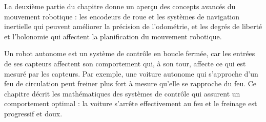 {\begin{description}
La deuxième partie du chapitre donne un aperçu des concepts avancés du mouvement robotique : les encodeurs de roue et les systèmes de navigation inertielle qui peuvent améliorer la précision de l'odométrie, et les degrés de liberté et l'holonomie qui affectent la planification du mouvement robotique.
\smallskip
\item [\textbf{Chapitre \ref{ch.control} Contrôle}] Un robot autonome est un système de contrôle en boucle fermée, car les entrées de ses capteurs affectent son comportement qui, à son tour, affecte ce qui est mesuré par les capteurs. Par exemple, une voiture autonome qui s'approche d'un feu de circulation peut freiner plus fort à mesure qu'elle se rapproche du feu. Ce chapitre décrit les mathématiques des systèmes de contrôle qui assurent un comportement optimal : la voiture s'arrête effectivement au feu et le freinage est progressif et doux.
\end{description}

}
